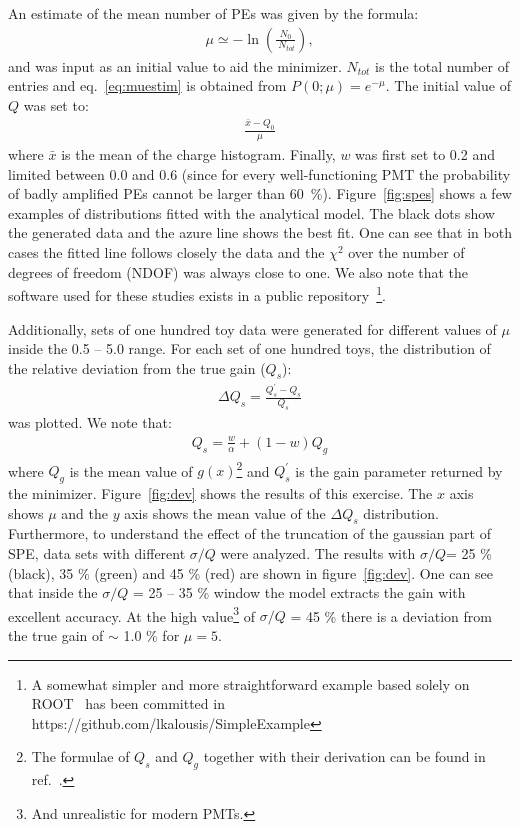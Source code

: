 \documentclass[preprint,12pt]{elsarticle}
\begin{document}
An estimate of the mean number of PEs was given by the formula: 
\begin{align}
\mu \simeq - \ln \left(  \frac{N_0}{\ N_{tot}} \right),  
\label{eq:muestim}
\end{align}
and was input as an initial value to aid the minimizer. 
$N_{tot}$ is the total number of entries and eq.~\eqref{eq:muestim} is obtained from $P(0; \mu ) = e^{-\mu}$. 
The initial value of $Q$ was set to: 
\begin{align}
\frac{ \bar x - Q_0 }{\mu}
\label{eq:laestim}
\end{align}
where $\bar x$ is the mean of the charge histogram. 
Finally, $w$ was first set to 0.2 and limited between 0.0 and 0.6 (since for every well-functioning PMT the probability of badly amplified PEs cannot be larger than 60~\%).
Figure~\ref{fig:spes} shows a few examples of distributions fitted with the analytical model. 
The black dots show the generated data and the azure line shows the best fit. 
One can see that in both cases the fitted line follows closely the data and the $\chi^2$ over the number of degrees of freedom (NDOF) was always close to one. 
We also note that the software used for these studies exists in a public repository~\cite{git}\footnote{%
A somewhat simpler and more straightforward example based solely on ROOT~\cite{root} has been committed in https://github.com/lkalousis/SimpleExample}. 

Additionally, sets of one hundred toy data were generated for different values of $\mu$ inside the 0.5 -- 5.0 range. 
For each set of one hundred toys, the distribution of the relative deviation from the true gain ($Q_s$):
\begin{align}
\Delta Q_s = \frac{ Q_s^\prime - Q_s }{ Q_s }
\label{eq:laestim}
\end{align}
was plotted. We note that:
\begin{align}
 Q_s = \frac{w}{\alpha} + (1-w)Q_g
\label{eq:laestim}
\end{align}
where $Q_g$ is the mean value of $g(x)$\footnote{The formulae of $Q_s$ and $Q_g$ together with their derivation can be found in ref.~\cite{me2}. } and $Q_s^\prime$ is the gain parameter returned by the minimizer.
Figure~\ref{fig:dev} shows the results of this exercise. 
The $x$ axis shows $\mu$ and the $y$ axis shows the mean value of the $\Delta Q_s$ distribution. 
Furthermore, to understand the effect of the truncation of the gaussian part of SPE,  data sets with different $\sigma/Q$ were analyzed. 
The results with $\sigma/Q$= 25 \% (black), 35 \% (green) and 45 \% (red) are shown in figure~\ref{fig:dev}. 
One can see that inside the $\sigma/Q$ = 25 -- 35 \% window the model extracts the gain with excellent accuracy. 
At the high value\footnote{And unrealistic for modern PMTs.}  of $\sigma/Q$ = 45 \% there is a deviation from the true gain of $\sim$ 1.0 \% for $\mu = 5$.
\end{document}
